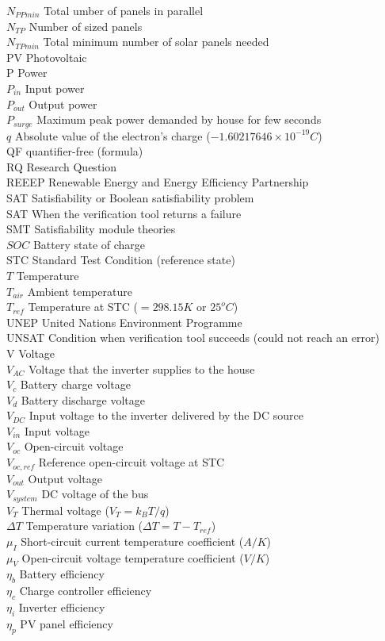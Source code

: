 $N_{PPmin}$ Total umber of panels in parallel \\
$ N_{TP} $ Number of sized panels \\
$N_{TPmin}$ Total minimum number of solar panels needed \\
PV Photovoltaic \\
P Power \\
$P_{in}$ Input power \\
$P_{out}$ Output power \\
$P_{surge}$ Maximum peak power demanded by house for few seconds \\
$q$ Absolute value of the electron's charge ($ -1.60217646\times10^{-19}C $) \\
QF  quantifier-free (formula) \\
RQ Research Question \\
REEEP Renewable Energy and Energy Efficiency Partnership \\
SAT Satisfiability or Boolean satisfiability problem \\
SAT When the verification tool returns a failure \\
SMT Satisfiability module theories \\
$ SOC $ Battery state of charge \\
STC Standard Test Condition (reference state) \\
$T$ Temperature \\
$ T_{air} $ Ambient temperature \\
$ T_{ref}$ Temperature at STC ($=298.15 K$ or $25^{o}C$) \\
UNEP United Nations Environment Programme \\
UNSAT Condition when verification tool succeeds (could not reach an error) \\
V Voltage \\
$ V_{AC}  $ Voltage that the inverter supplies to the house \\
$V_{c}$ Battery charge voltage  \\
$V_{d}$ Battery discharge voltage \\
$ V_{DC} $ Input voltage to the inverter delivered by the DC source \\
$ V_{in} $ Input voltage \\
$ V_{oc} $ Open-circuit voltage \\
$ V_{oc,ref} $ Reference open-circuit voltage at STC \\
$ V_{out} $ Output voltage \\
$ V_{system} $ DC voltage of the bus \\
$V_{T}$ Thermal voltage ($ V_{T}=k_{B}T/q $) \\
$\Delta T$ Temperature variation ($\Delta T=T-T_{ref} $) \\
$ \mu_{I} $ Short-circuit current temperature coefficient ($A/K$) \\
$ \mu_{V} $ Open-circuit voltage temperature coefficient ($ V/K $) \\
$\eta_{b}$ Battery efficiency \\
$\eta_{c}$ Charge controller efficiency \\
$\eta_{i}$ Inverter efficiency \\
$\eta_{p}$ PV panel efficiency \\